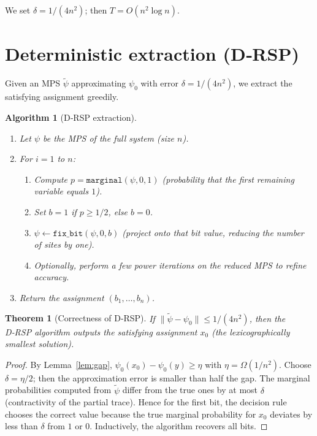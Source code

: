 \documentclass[11pt,a4paper]{article}
\newtheorem{theorem}{Theorem}[section]
\newtheorem{algorithm}{Algorithm}[section]
\begin{document}
We set $\delta = 1/(4n^2)$; then $T = O(n^2 \log n)$.

\section{Deterministic extraction (D‑RSP)}

Given an MPS $\tilde{\psi}$ approximating $\psi_0$ with error $\delta = 1/(4n^2)$, we extract the satisfying assignment greedily.

\begin{algorithm}[D‑RSP extraction]\label{alg:drsp}
\begin{enumerate}
\item Let $\psi$ be the MPS of the full system (size $n$).
\item For $i = 1$ to $n$:
   \begin{enumerate}
   \item Compute $p = \texttt{marginal}(\psi, 0, 1)$ (probability that the first remaining variable equals $1$).
   \item Set $b = 1$ if $p \ge 1/2$, else $b = 0$.
   \item $\psi \leftarrow \texttt{fix\_bit}(\psi, 0, b)$ (project onto that bit value, reducing the number of sites by one).
   \item Optionally, perform a few power iterations on the reduced MPS to refine accuracy.
   \end{enumerate}
\item Return the assignment $(b_1,\dots,b_n)$.
\end{enumerate}
\end{algorithm}

\begin{theorem}[Correctness of D‑RSP]\label{thm:drsp}
If $\|\tilde{\psi} - \psi_0\| \le 1/(4n^2)$, then the D‑RSP algorithm outputs the satisfying assignment $x_0$ (the lexicographically smallest solution).
\end{theorem}
\begin{proof}
By Lemma~\ref{lem:gap}, $\psi_0(x_0) - \psi_0(y) \ge \eta$ with $\eta = \Omega(1/n^2)$. Choose $\delta = \eta/2$; then the approximation error is smaller than half the gap. The marginal probabilities computed from $\tilde{\psi}$ differ from the true ones by at most $\delta$ (contractivity of the partial trace). Hence for the first bit, the decision rule chooses the correct value because the true marginal probability for $x_0$ deviates by less than $\delta$ from $1$ or $0$. Inductively, the algorithm recovers all bits.
\end{proof}
\end{document}
